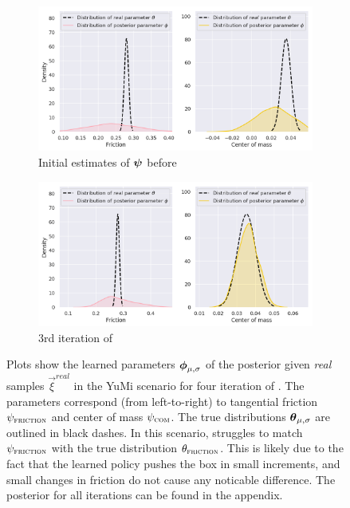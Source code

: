 \begin{figure}
\centering
\captionsetup{size=footnotesize}
\begin{subfigure}{\textwidth}
  \includegraphics[width=\textwidth]{img/yumi/latent-representation/yumi_latent_encoding_0_iter}%
  \caption{Initial estimates of $\boldsymbol{\psi}$ before \dettostoc{}}
\end{subfigure}
\begin{subfigure}{\textwidth}
  \centering
  \includegraphics[width=\linewidth]{img/yumi/latent-representation/yumi_latent_encoding_3_iter}
  \caption{3rd iteration of \dettostoc{}}
\end{subfigure}
\caption{Plots show the learned parameters $\boldsymbol{\phi}_{\mu, \sigma}$ of the posterior given \emph{real} samples $\vec{\xi}^{real}$ in the YuMi scenario for four iteration of \dettostoc{}.
The parameters correspond (from left-to-right) to tangential friction $\psi_{\textsc{friction}}$ and center of mass $\psi_{\textsc{com}}$. The true distributions $\boldsymbol{\theta}_{\mu, \sigma}$ are outlined in black dashes. In this scenario, \dettostoc{} struggles to match $\psi_{\textsc{friction}}{}$ with the true distribution $\theta_\textsc{friction}$. This is likely due to the fact that the learned policy pushes the box in small increments, and small changes in friction do not cause any noticable difference. The posterior for all iterations can be found in the appendix.}
\label{fig:yumi/latentspace}
\end{figure}